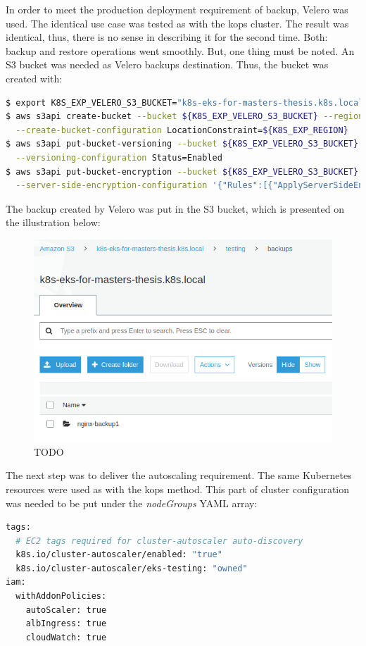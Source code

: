 In order to meet the production deployment requirement of backup, Velero was used. The identical use case was tested as with the kops cluster. The result was identical, thus, there is no sense in describing it for the second time. Both: backup and restore operations went smoothly. But, one thing must be noted. An S3 bucket was needed as Velero backups destination. Thus, the bucket was created with:
\begin{lstlisting}[basicstyle=\tiny,caption={TODO},captionpos=b,language=Bash,xleftmargin=1cm]
$ export K8S_EXP_VELERO_S3_BUCKET="k8s-eks-for-masters-thesis.k8s.local"
$ aws s3api create-bucket --bucket ${K8S_EXP_VELERO_S3_BUCKET} --region ${K8S_EXP_REGION} \
  --create-bucket-configuration LocationConstraint=${K8S_EXP_REGION}
$ aws s3api put-bucket-versioning --bucket ${K8S_EXP_VELERO_S3_BUCKET} \
  --versioning-configuration Status=Enabled
$ aws s3api put-bucket-encryption --bucket ${K8S_EXP_VELERO_S3_BUCKET} \
  --server-side-encryption-configuration '{"Rules":[{"ApplyServerSideEncryptionByDefault":{"SSEAlgorithm":"AES256"}}]}'
\end{lstlisting}
The backup created by Velero was put in the S3 bucket, which is presented on the illustration below:
\begin{figure}[H]
    \centering
    \includegraphics[width=14cm]{figures/eks-backup.png}
    \captionsetup{justification=centering,margin=2cm}
    \caption{TODO}
\end{figure}

The next step was to deliver the autoscaling requirement. The same Kubernetes resources were used as with the kops method. This part of cluster configuration was needed to be put under the \textit{nodeGroups} YAML array:
\begin{lstlisting}[basicstyle=\tiny,caption={TODO},captionpos=b,language=Bash,xleftmargin=1cm]
tags:
  # EC2 tags required for cluster-autoscaler auto-discovery
  k8s.io/cluster-autoscaler/enabled: "true"
  k8s.io/cluster-autoscaler/eks-testing: "owned"
iam:
  withAddonPolicies:
    autoScaler: true
    albIngress: true
    cloudWatch: true
\end{lstlisting}

